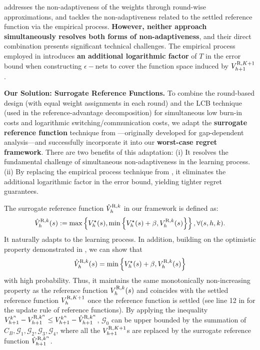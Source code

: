 \documentclass{article}
\newcommand{\R}{\textnormal{R}}
\begin{document}
\cite{zheng2023federated} addresses the non-adaptiveness of the weights through round-wise approximations, and \cite{li2023breaking} tackles the non-adaptiveness related to the settled reference function via the empirical process. \textbf{However, neither approach simultaneously resolves both forms of non-adaptiveness}, and their direct combination presents significant technical challenges. The empirical process employed in \cite{li2023breaking} introduces \textbf{an additional logarithmic factor} of $T$ in the error bound when constructing $\epsilon-$nets to cover the function space induced by $V_{h+1}^{\R,K+1}$.

\textbf{Our Solution: Surrogate Reference Functions.} To combine the round-based design (with equal weight assignments in each round) and the LCB technique (used in the reference-advantage decomposition) for simultaneous low burn-in costs and logarithmic switching/communication costs, we adapt the \textbf{surrogate reference function} technique from \cite{zheng2024gap}---originally developed for gap-dependent analysis---and successfully incorporate it into our \textbf{worst-case regret framework}. There are two benefits of this adaptation: (i) It resolves the fundamental challenge of simultaneous non-adaptiveness in the learning process. (ii) By replacing the empirical process technique from \cite{li2023breaking}, it eliminates the additional logarithmic factor in the error bound, yielding tighter regret guarantees.

The surrogate reference function $\hat{V}_h^{\R,k}$ in our framework is defined as:
\begin{equation*}\label{eq_def_surro}
    \hat{V}_h^{\R,k}(s) :=\max\left\{V_h^\star(s), \min \left\{V_h^\star(s)+\beta, V_h^{\R,k}(s)\right\}\right\},\forall (s,h,k).
\end{equation*}
It naturally adapts to the learning process. In addition, building on the optimistic property demonstrated in , we can show that $$\hat{V}_h^{\R,k}(s) = \min \left\{V_h^\star(s)+\beta, V_h^{\R,k}(s)\right\}$$ with high probability. Thus, it maintains the same monotonically non-increasing property as the reference function $V_h^{\R,k}(s)$ and coincides with the settled reference function $V_h^{\R,K+1}$ once the reference function is settled (see line 12 in  for the update rule of reference functions). By applying the inequality $V_{h+1}^{k^n}-V_{h+1}^{\R,k^n}\leq V_{h+1}^{k^n}-\hat{V}_{h+1}^{\R,k^n}$, $\mathcal{G}_0$ can be upper bounded by the summation of $C_B,\mathcal{G}_1,\mathcal{G}_2,\mathcal{G}_3,\mathcal{G}_4$, where all the $V_{h+1}^{\R,K+1}$s are replaced by the surrogate reference function $\hat{V}_{h+1}^{\R,k^n}$. 
\end{document}
